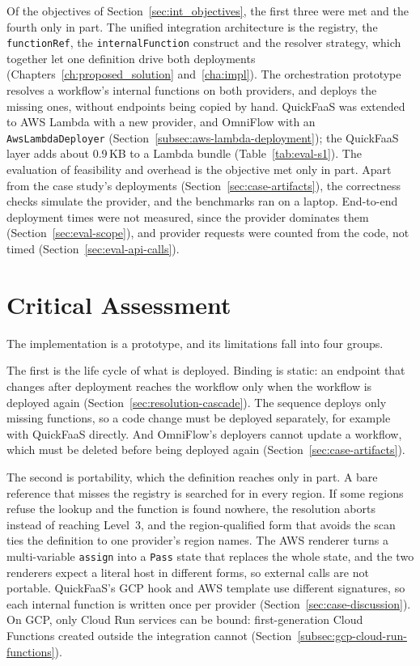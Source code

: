 Of the objectives of Section~\ref{sec:int_objectives}, the first three were met and the fourth only
in part. The unified integration architecture is the registry, the \texttt{functionRef}, the
\texttt{internalFunction} construct and the resolver strategy, which together let one definition
drive both deployments (Chapters~\ref{ch:proposed_solution} and~\ref{cha:impl}). The orchestration
prototype resolves a workflow's internal functions on both providers, and deploys the missing ones,
without endpoints being copied by hand. QuickFaaS was extended to AWS Lambda with a new provider,
and OmniFlow with an \texttt{AwsLambdaDeployer} (Section~\ref{subsec:aws-lambda-deployment}); the
QuickFaaS layer adds about 0.9\,KB to a Lambda bundle (Table~\ref{tab:eval-s1}). The
evaluation of feasibility and overhead is the objective met only in part. Apart from the case
study's deployments (Section~\ref{sec:case-artifacts}), the correctness checks simulate the
provider, and the benchmarks ran on a laptop. End-to-end deployment times were not measured, since
the provider dominates them (Section~\ref{sec:eval-scope}), and provider requests were counted from
the code, not timed (Section~\ref{sec:eval-api-calls}).

\section{Critical Assessment}
\label{sec:concl-critical}

The implementation is a prototype, and its limitations fall into four groups.

The first is the life cycle of what is deployed. Binding is static: an endpoint that changes after
deployment reaches the workflow only when the workflow is deployed again
(Section~\ref{sec:resolution-cascade}). The sequence deploys only missing functions, so a code change
must be deployed separately, for example with QuickFaaS directly. And OmniFlow's deployers cannot
update a workflow, which must be deleted before being deployed again
(Section~\ref{sec:case-artifacts}).

The second is portability, which the definition reaches only in part. A bare reference that misses
the registry is searched for in every region. If some regions refuse the lookup and the function is
found nowhere, the resolution aborts instead of reaching Level~3, and the region-qualified form that
avoids the scan ties the definition to one provider's region names. The AWS renderer turns a
multi-variable \texttt{assign} into a \texttt{Pass} state that replaces the whole state, and the two
renderers expect a literal host in different forms, so external calls are not portable. QuickFaaS's
GCP hook and AWS template use different signatures, so each internal function is written once per
provider (Section~\ref{sec:case-discussion}). On GCP, only Cloud Run services can be bound:
first-generation Cloud Functions created outside the integration cannot
(Section~\ref{subsec:gcp-cloud-run-functions}).

